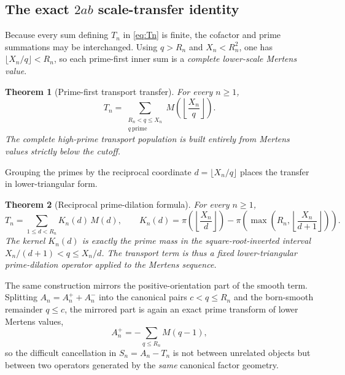 \documentclass[11pt]{article}
\newtheorem{theorem}{Theorem}[section]
\theoremstyle{definition}
\newcommand{\1}{\mathbf{1}}
\begin{document}
\subsection{The exact $2ab$ scale-transfer identity}

Because every sum defining $T_n$ in \cref{eq:Tn} is finite, the cofactor and prime summations may be interchanged.  Using $q>R_n$ and $X_n<R_n^2$, one has $\lfloor X_n/q\rfloor<R_n$, so each prime-first inner sum is a \emph{complete lower-scale Mertens value}.

\begin{theorem}[Prime-first transport transfer]
\label{thm:transport-primefirst}
For every $n\ge1$,
\begin{equation}
 \boxed{
 T_n
 =\sum_{\substack{R_n<q\le X_n\\ q\ \mathrm{prime}}}
 M\!\left(\left\lfloor\frac{X_n}{q}\right\rfloor\right).
 }
 \label{eq:transport-primefirst}
\end{equation}
The complete high-prime transport population is built entirely from Mertens values strictly below the cutoff.
\end{theorem}

Grouping the primes by the reciprocal coordinate $d=\lfloor X_n/q\rfloor$ places the transfer in lower-triangular form.

\begin{theorem}[Reciprocal prime-dilation formula]
\label{thm:prime-dilation}
For every $n\ge1$,
\begin{equation}
 \boxed{
 T_n=\sum_{1\le d<R_n}K_n(d)\,M(d),
 \qquad
 K_n(d)=\pi\!\left(\left\lfloor\frac{X_n}{d}\right\rfloor\right)
 -\pi\!\left(\max\!\left(R_n,\left\lfloor\frac{X_n}{d+1}\right\rfloor\right)\right).
 }
 \label{eq:prime-dilation}
\end{equation}
The kernel $K_n(d)$ is exactly the prime mass in the square-root-inverted interval $X_n/(d+1)<q\le X_n/d$.  The transport term is thus a fixed lower-triangular prime-dilation operator applied to the Mertens sequence.
\end{theorem}

The same construction mirrors the positive-orientation part of the smooth term.  Splitting $A_n=A_n^++A_n^-$ into the canonical pairs $c<q\le R_n$ and the born-smooth remainder $q\le c$, the mirrored part is again an exact prime transform of lower Mertens values,
\begin{equation}
 A_n^+=-\sum_{q\le R_n}M(q-1),
 \label{eq:A-plus-primeform}
\end{equation}
so the difficult cancellation in $S_n=A_n-T_n$ is not between unrelated objects but between two operators generated by the \emph{same} canonical factor geometry.
\end{document}
